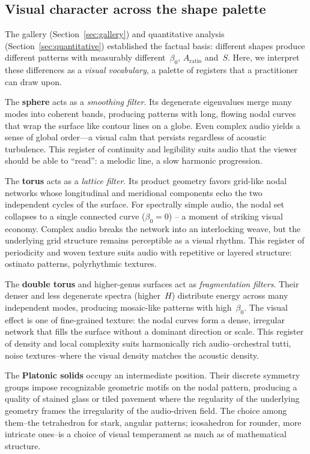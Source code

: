\documentclass[]{interact}
\theoremstyle{plain}
\theoremstyle{definition}
\theoremstyle{remark}
\begin{document}
\subsection{Visual character across the shape palette}
\label{sec:visual_character}

The gallery (Section~\ref{sec:gallery}) and quantitative analysis (Section~\ref{sec:quantitative}) established the factual basis: different shapes produce different patterns with measurably different~$\beta_0$, $A_{\mathrm{ratio}}$ and~$S$. Here, we interpret these differences as a \emph{visual vocabulary}, a palette of registers that a practitioner can draw upon.

The \textbf{sphere} acts as a \emph{smoothing filter}. Its degenerate eigenvalues merge many modes into coherent bands, producing patterns with long, flowing nodal curves that wrap the surface like contour lines on a globe. Even complex audio yields a sense of global order---a visual calm that persists regardless of acoustic turbulence. This register of continuity and legibility suits audio that the viewer should be able to ``read'': a melodic line, a slow harmonic progression.

The \textbf{torus} acts as a \emph{lattice filter}. Its product geometry favors grid-like nodal networks whose longitudinal and meridional components echo the two independent cycles of the surface. For spectrally simple audio, the nodal set collapses to a single connected curve ($\beta_0=0$) -- a moment of striking visual economy. Complex audio breaks the network into an interlocking weave, but the underlying grid structure remains perceptible as a visual rhythm. This register of periodicity and woven texture suits audio with repetitive or layered structure: ostinato patterns, polyrhythmic textures.

The \textbf{double torus} and higher-genus surfaces act as \emph{fragmentation filters}. Their denser and less degenerate spectra (higher~$H$) distribute energy across many independent modes, producing mosaic-like patterns with high~$\beta_0$. The visual effect is one of fine-grained texture: the nodal curves form a dense, irregular network that fills the surface without a dominant direction or scale. This register of density and local complexity suits harmonically rich audio--orchestral tutti, noise textures--where the visual density matches the acoustic density.

The \textbf{Platonic solids} occupy an intermediate position. Their discrete symmetry groups impose recognizable geometric motifs on the nodal pattern, producing a quality of stained glass or tiled pavement where the regularity of the underlying geometry frames the irregularity of the audio-driven field. The choice among them--the tetrahedron for stark, angular patterns; icosahedron for rounder, more intricate ones--is a choice of visual temperament as much as of mathematical structure.
\end{document}
